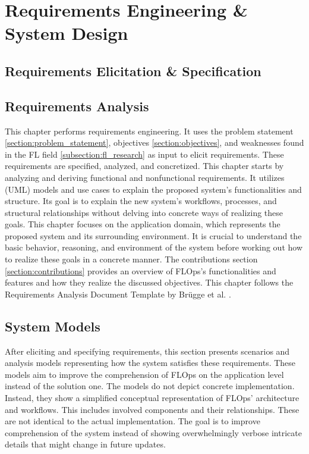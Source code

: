 \chapter{Requirements Engineering \& System Design}

\section{Requirements Elicitation \& Specification}






\section{Requirements Analysis}

This chapter performs requirements engineering.
It uses the problem statement \ref{section:problem_statement}, objectives \ref{section:objectives}, and weaknesses found in the FL field \ref{subsection:fl_research} as input to elicit requirements.
These requirements are specified, analyzed, and concretized. 
This chapter starts by analyzing and deriving functional and nonfunctional requirements.
It utilizes (UML) models and use cases to explain the proposed system's functionalities and structure.
Its goal is to explain the new system's workflows, processes, and structural relationships without delving into concrete ways of realizing these goals.
This chapter focuses on the application domain, which represents the proposed system and its surrounding environment.
It is crucial to understand the basic behavior, reasoning, and environment of the system before working out how to realize these goals in a concrete manner.
The contributions section \ref{section:contributions} provides an overview of FLOps's functionalities and features and how they realize the discussed objectives.
This chapter follows the Requirements Analysis Document Template by Brügge et al. \cite{book:bruegge}.


\section{System Models}

After eliciting and specifying requirements, this section presents scenarios and analysis models representing how the system satisfies these requirements.
These models aim to improve the comprehension of FLOps on the application level instead of the solution one.
The models do not depict concrete implementation.
Instead, they show a simplified conceptual representation of FLOps' architecture and workflows.
This includes involved components and their relationships.
These are not identical to the actual implementation.
The goal is to improve comprehension of the system instead of showing overwhelmingly verbose intricate details that might change in future updates.

